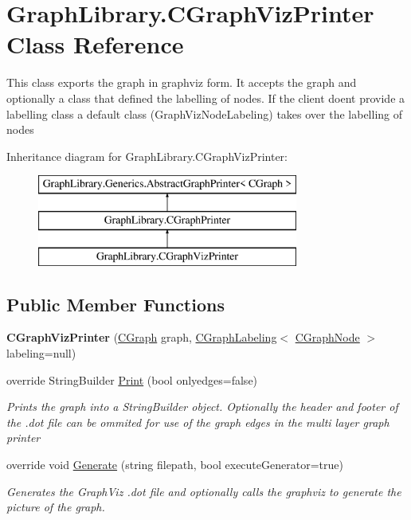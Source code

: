 \hypertarget{class_graph_library_1_1_c_graph_viz_printer}{}\section{Graph\+Library.\+C\+Graph\+Viz\+Printer Class Reference}
\label{class_graph_library_1_1_c_graph_viz_printer}


This class exports the graph in graphviz form. It accepts the graph and optionally a class that defined the labelling of nodes. If the client doen\textquotesingle{}t provide a labelling class a default class (Graph\+Viz\+Node\+Labeling) takes over the labelling of nodes  


Inheritance diagram for Graph\+Library.\+C\+Graph\+Viz\+Printer\+:\begin{figure}[H]
\begin{center}
\leavevmode
\includegraphics[height=3.000000cm]{class_graph_library_1_1_c_graph_viz_printer}
\end{center}
\end{figure}
\subsection*{Public Member Functions}
\begin{DoxyCompactItemize}
\item 
\hypertarget{class_graph_library_1_1_c_graph_viz_printer_abb31a40f8b3a16c8abe21ca13d4debb0}{}{\bfseries C\+Graph\+Viz\+Printer} (\hyperlink{class_graph_library_1_1_c_graph}{C\+Graph} graph, \hyperlink{class_graph_library_1_1_c_graph_labeling}{C\+Graph\+Labeling}$<$ \hyperlink{class_graph_library_1_1_c_graph_node}{C\+Graph\+Node} $>$ labeling=null)\label{class_graph_library_1_1_c_graph_viz_printer_abb31a40f8b3a16c8abe21ca13d4debb0}

\item 
override String\+Builder \hyperlink{class_graph_library_1_1_c_graph_viz_printer_a5341d69647f313d81387578a629d1ed5}{Print} (bool onlyedges=false)
\begin{DoxyCompactList}\small\item\em Prints the graph into a String\+Builder object. Optionally the header and footer of the .dot file can be ommited for use of the graph edges in the multi layer graph printer \end{DoxyCompactList}\item 
override void \hyperlink{class_graph_library_1_1_c_graph_viz_printer_a9d4366ecf1b1f27c8886f0891ae5f5cf}{Generate} (string filepath, bool execute\+Generator=true)
\begin{DoxyCompactList}\small\item\em Generates the Graph\+Viz .dot file and optionally calls the graphviz to generate the picture of the graph. \end{DoxyCompactList}\end{DoxyCompactItemize}
